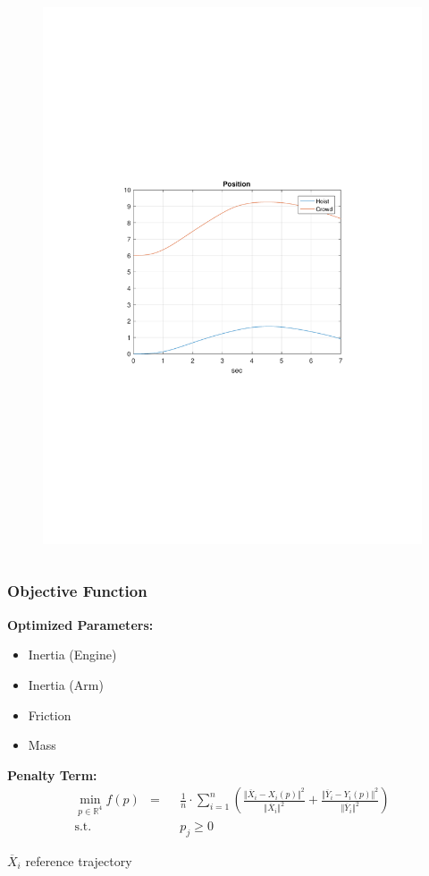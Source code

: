 \begin{frame}[c]
\begin{columns}[T]
\begin{figure}
			\includegraphics[trim=4cm 9cm 4cm 9.5cm, clip=true, width=\linewidth]{img/Position}
		\end{figure}
	\end{columns}
\end{frame}

\begin{frame}[c]
	\frametitle{Objective Function}
	\textbf{Optimized Parameters:}
	\begin{itemize}
		\item{Inertia (Engine)}
		\item{Inertia (Arm)}
		\item{Friction}
		\item{Mass}
	\end{itemize}
	\vspace{.5cm}
	\textbf{Penalty Term:}
	\begin{align*}
		\min_{p\in\mathbb{R}^4}f(p) & = & & \frac 1 n \cdot \sum_{i=1}^{n} \left(\frac{\Vert \overline{X}_i - X_i \left(p\right)\Vert^2}{\Vert \overline{X}_i\Vert^2} + \frac{\Vert \overline{Y}_i - Y_i \left(p\right)\Vert^2}{\Vert \overline{Y}_i\Vert^2}\right) \\
		\operatorname{s.t.} & & & p_j \geq 0
	\end{align*}
	
	$\overline{X}_i$ reference trajectory
\end{frame}

